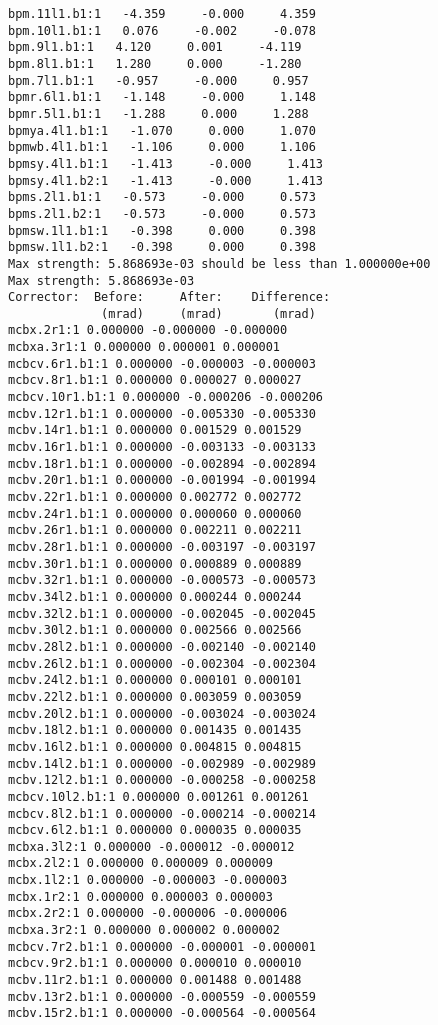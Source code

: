 \begin{verbatim}
bpm.11l1.b1:1   -4.359     -0.000     4.359
bpm.10l1.b1:1   0.076     -0.002     -0.078
bpm.9l1.b1:1   4.120     0.001     -4.119
bpm.8l1.b1:1   1.280     0.000     -1.280
bpm.7l1.b1:1   -0.957     -0.000     0.957
bpmr.6l1.b1:1   -1.148     -0.000     1.148
bpmr.5l1.b1:1   -1.288     0.000     1.288
bpmya.4l1.b1:1   -1.070     0.000     1.070
bpmwb.4l1.b1:1   -1.106     0.000     1.106
bpmsy.4l1.b1:1   -1.413     -0.000     1.413
bpmsy.4l1.b2:1   -1.413     -0.000     1.413
bpms.2l1.b1:1   -0.573     -0.000     0.573
bpms.2l1.b2:1   -0.573     -0.000     0.573
bpmsw.1l1.b1:1   -0.398     0.000     0.398
bpmsw.1l1.b2:1   -0.398     0.000     0.398
Max strength: 5.868693e-03 should be less than 1.000000e+00
Max strength: 5.868693e-03
Corrector:  Before:     After:    Difference:
             (mrad)     (mrad)       (mrad)  
mcbx.2r1:1 0.000000 -0.000000 -0.000000
mcbxa.3r1:1 0.000000 0.000001 0.000001
mcbcv.6r1.b1:1 0.000000 -0.000003 -0.000003
mcbcv.8r1.b1:1 0.000000 0.000027 0.000027
mcbcv.10r1.b1:1 0.000000 -0.000206 -0.000206
mcbv.12r1.b1:1 0.000000 -0.005330 -0.005330
mcbv.14r1.b1:1 0.000000 0.001529 0.001529
mcbv.16r1.b1:1 0.000000 -0.003133 -0.003133
mcbv.18r1.b1:1 0.000000 -0.002894 -0.002894
mcbv.20r1.b1:1 0.000000 -0.001994 -0.001994
mcbv.22r1.b1:1 0.000000 0.002772 0.002772
mcbv.24r1.b1:1 0.000000 0.000060 0.000060
mcbv.26r1.b1:1 0.000000 0.002211 0.002211
mcbv.28r1.b1:1 0.000000 -0.003197 -0.003197
mcbv.30r1.b1:1 0.000000 0.000889 0.000889
mcbv.32r1.b1:1 0.000000 -0.000573 -0.000573
mcbv.34l2.b1:1 0.000000 0.000244 0.000244
mcbv.32l2.b1:1 0.000000 -0.002045 -0.002045
mcbv.30l2.b1:1 0.000000 0.002566 0.002566
mcbv.28l2.b1:1 0.000000 -0.002140 -0.002140
mcbv.26l2.b1:1 0.000000 -0.002304 -0.002304
mcbv.24l2.b1:1 0.000000 0.000101 0.000101
mcbv.22l2.b1:1 0.000000 0.003059 0.003059
mcbv.20l2.b1:1 0.000000 -0.003024 -0.003024
mcbv.18l2.b1:1 0.000000 0.001435 0.001435
mcbv.16l2.b1:1 0.000000 0.004815 0.004815
mcbv.14l2.b1:1 0.000000 -0.002989 -0.002989
mcbv.12l2.b1:1 0.000000 -0.000258 -0.000258
mcbcv.10l2.b1:1 0.000000 0.001261 0.001261
mcbcv.8l2.b1:1 0.000000 -0.000214 -0.000214
mcbcv.6l2.b1:1 0.000000 0.000035 0.000035
mcbxa.3l2:1 0.000000 -0.000012 -0.000012
mcbx.2l2:1 0.000000 0.000009 0.000009
mcbx.1l2:1 0.000000 -0.000003 -0.000003
mcbx.1r2:1 0.000000 0.000003 0.000003
mcbx.2r2:1 0.000000 -0.000006 -0.000006
mcbxa.3r2:1 0.000000 0.000002 0.000002
mcbcv.7r2.b1:1 0.000000 -0.000001 -0.000001
mcbcv.9r2.b1:1 0.000000 0.000010 0.000010
mcbv.11r2.b1:1 0.000000 0.001488 0.001488
mcbv.13r2.b1:1 0.000000 -0.000559 -0.000559
mcbv.15r2.b1:1 0.000000 -0.000564 -0.000564

\end{verbatim}
